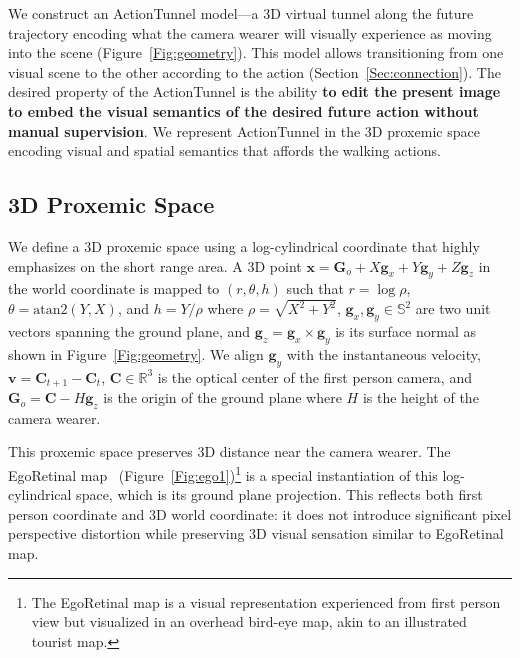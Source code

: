 \documentclass[10pt,twocolumn,letterpaper]{article}
\begin{document}
We construct an ActionTunnel model---a 3D virtual tunnel along the future trajectory encoding what the camera wearer will visually experience as moving into the scene (Figure~\ref{Fig:geometry}). This model allows transitioning from one visual scene to the other according to the action (Section~\ref{Sec:connection}). The desired property of the ActionTunnel is the ability \textbf{to edit the present image to embed the visual semantics of the desired future action without manual supervision}. We represent ActionTunnel in the 3D proxemic space~\cite{hall:1963} encoding visual and spatial semantics that affords the walking actions. 







\subsection{3D Proxemic Space} \label{Sec:fps}
We define a 3D proxemic space using a log-cylindrical coordinate that highly emphasizes on the short range area. A 3D point $\mathbf{x}=\mathbf{G}_{o}+X\mathbf{g}_x+Y\mathbf{g}_y+Z\mathbf{g}_z$ in the world coordinate is mapped to $(r, \theta, h)$ such that $r=\log{\rho}$, $\theta=\text{atan2}(Y, X)$, and $h=Y/\rho$ where $\rho=\sqrt{X^2+Y^2}$, $\mathbf{g}_x, \mathbf{g}_y \in \mathds{S}^2$ are two unit vectors spanning the ground plane, and $\mathbf{g}_z = \mathbf{g}_x \times \mathbf{g}_y$ is its surface normal as shown in Figure~\ref{Fig:geometry}. We align $\mathbf{g}_y$ with the instantaneous velocity, $\mathbf{v}=\mathbf{C}_{t+1}-\mathbf{C}_t$, $\mathbf{C}\in \mathds{R}^3$ is the optical center of the first person camera, and $\mathbf{G}_o=\mathbf{C}-H\mathbf{g}_z$ is the origin of the ground plane where $H$ is the height of the camera wearer. 




This proxemic space preserves 3D distance near the camera wearer. The EgoRetinal map~\cite{park:2016_future} (Figure~\ref{Fig:ego1})\footnote{The EgoRetinal map is a visual representation experienced from first person view but visualized in an overhead bird-eye map, akin to an illustrated tourist map.} is a special instantiation of this log-cylindrical space, which is its ground plane projection. This reflects both first person coordinate and 3D world coordinate: it does not introduce significant pixel perspective distortion while preserving 3D visual sensation similar to EgoRetinal map.
\end{document}
